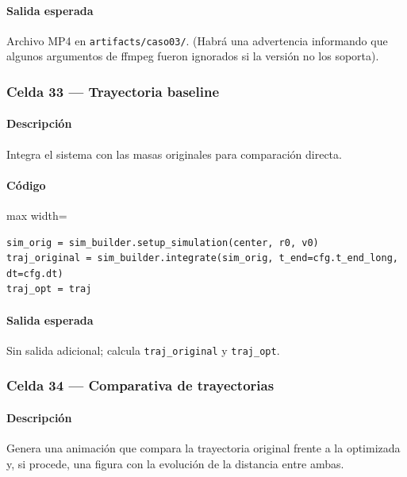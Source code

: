 \paragraph{Salida esperada} Archivo MP4 en \texttt{artifacts/caso03/}. (Habrá una advertencia informando que algunos argumentos de ffmpeg fueron ignorados si la versión no los soporta).

\subsubsection*{Celda 33 — Trayectoria baseline}
\paragraph{Descripción} Integra el sistema con las masas originales para comparación directa.
\paragraph{Código}
\par\smallskip
\begin{listing}[H]
\caption{Celda 33: trayectoria con masas originales}
\begin{adjustbox}{max width=\textwidth}
\begin{minipage}{\textwidth}
\begin{verbatim}
sim_orig = sim_builder.setup_simulation(center, r0, v0)
traj_original = sim_builder.integrate(sim_orig, t_end=cfg.t_end_long, dt=cfg.dt)
traj_opt = traj
\end{verbatim}
\end{minipage}
\end{adjustbox}
\end{listing}
\paragraph{Salida esperada} Sin salida adicional; calcula \texttt{traj\_original} y \texttt{traj\_opt}.

\subsubsection*{Celda 34 — Comparativa de trayectorias}
\paragraph{Descripción} Genera una animación que compara la trayectoria original frente a la optimizada y, si procede, una figura con la evolución de la distancia entre ambas.
